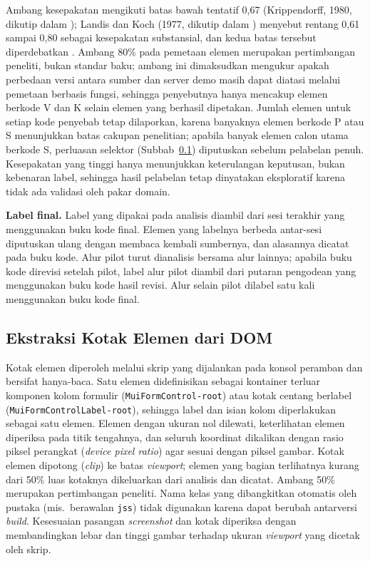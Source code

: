 Ambang kesepakatan mengikuti batas bawah tentatif 0,67 (Krippendorff, 1980, dikutip dalam \citealp{hallgren2012computing}); Landis dan Koch (1977, dikutip dalam \citealp{hallgren2012computing}) menyebut rentang 0,61 sampai 0,80 sebagai kesepakatan substansial, dan kedua batas tersebut diperdebatkan \citep{hallgren2012computing}. Ambang 80\% pada pemetaan elemen merupakan pertimbangan peneliti, bukan standar baku; ambang ini dimaksudkan mengukur apakah perbedaan versi antara sumber dan server demo masih dapat diatasi melalui pemetaan berbasis fungsi, sehingga penyebutnya hanya mencakup elemen berkode V dan K selain elemen yang berhasil dipetakan. Jumlah elemen untuk setiap kode penyebab tetap dilaporkan, karena banyaknya elemen berkode P atau S menunjukkan batas cakupan penelitian; apabila banyak elemen calon utama berkode S, perluasan selektor (Subbab~\ref{subsec:ekstraksi-dom}) diputuskan sebelum pelabelan penuh. Kesepakatan yang tinggi hanya menunjukkan keterulangan keputusan, bukan kebenaran label, sehingga hasil pelabelan tetap dinyatakan eksploratif karena tidak ada validasi oleh pakar domain.

\textbf{Label final.} Label yang dipakai pada analisis diambil dari sesi terakhir yang menggunakan buku kode final. Elemen yang labelnya berbeda antar-sesi diputuskan ulang dengan membaca kembali sumbernya, dan alasannya dicatat pada buku kode. Alur pilot turut dianalisis bersama alur lainnya; apabila buku kode direvisi setelah pilot, label alur pilot diambil dari putaran pengodean yang menggunakan buku kode hasil revisi. Alur selain pilot dilabel satu kali menggunakan buku kode final.

\subsection{Ekstraksi Kotak Elemen dari DOM}
\label{subsec:ekstraksi-dom}

Kotak elemen diperoleh melalui skrip yang dijalankan pada konsol peramban dan bersifat hanya-baca. Satu elemen didefinisikan sebagai kontainer terluar komponen kolom formulir (\texttt{MuiFormControl-root}) atau kotak centang berlabel (\texttt{MuiFormControlLabel-root}), sehingga label dan isian kolom diperlakukan sebagai satu elemen. Elemen dengan ukuran nol dilewati, keterlihatan elemen diperiksa pada titik tengahnya, dan seluruh koordinat dikalikan dengan rasio piksel perangkat (\emph{device pixel ratio}) agar sesuai dengan piksel gambar. Kotak elemen dipotong (\emph{clip}) ke batas \emph{viewport}; elemen yang bagian terlihatnya kurang dari 50\% luas kotaknya dikeluarkan dari analisis dan dicatat. Ambang 50\% merupakan pertimbangan peneliti. Nama kelas yang dibangkitkan otomatis oleh pustaka (mis.\ berawalan \texttt{jss}) tidak digunakan karena dapat berubah antarversi \emph{build}. Kesesuaian pasangan \emph{screenshot} dan kotak diperiksa dengan membandingkan lebar dan tinggi gambar terhadap ukuran \emph{viewport} yang dicetak oleh skrip.

